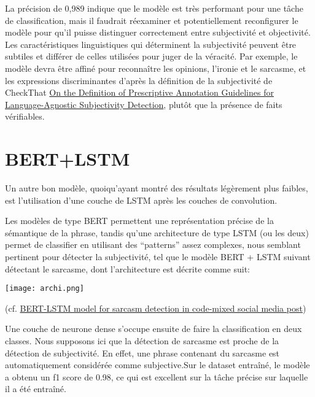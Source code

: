 \documentclass[11pt]{rapport_class}
\begin{document}
La précision de 0,989 indique que le modèle est très performant pour une tâche de classification, mais il faudrait réexaminer et potentiellement reconfigurer le modèle pour qu'il puisse distinguer correctement entre subjectivité et objectivité. Les caractéristiques linguistiques qui déterminent la subjectivité peuvent être subtiles et différer de celles utilisées pour juger de la véracité. Par exemple, le modèle devra être affiné pour reconnaître les opinions, l’ironie et le sarcasme, et les expressions discriminantes d'après la définition de la subjectivité de CheckThat \href{https://ceur-ws.org/Vol-3370/paper10.pdf}{On the Definition of Prescriptive Annotation
Guidelines for Language-Agnostic Subjectivity
Detection}, plutôt que la présence de faits vérifiables.

\section{BERT+LSTM}
\qquad Un autre bon modèle, quoiqu'ayant montré des résultats légèrement plus faibles, est l'utilisation d'une couche de LSTM après les couches de convolution.
\vspace{0mm}

Les modèles de type BERT permettent une représentation précise de la sémantique de la phrase, tandis qu'une architecture de type LSTM (ou les deux) permet de classifier en utilisant des “patterns” assez complexes, nous semblant pertinent pour détecter la subjectivité, tel que le modèle BERT + LSTM suivant détectant le sarcasme, dont l'architecture est décrite comme suit:

\begin{center}
    \texttt{[image: archi.png]}\\
    \begin{tiny}
        (cf. \href{https://link-springer-com.gorgone.univ-toulouse.fr/article/10.1007/s10844-022-00755-z}{BERT-LSTM model for sarcasm detection in code-mixed social media post})\\
        \vspace{0mm}
    \end{tiny}
\end{center}

\qquad Une couche de neurone dense s’occupe ensuite de faire la classification en deux classes. Nous supposons ici que la détection de sarcasme est proche de la détection de subjectivité. En effet, une phrase contenant du sarcasme est automatiquement considérée comme subjective.Sur le dataset entraîné, le modèle a obtenu un f1 score de 0.98, ce qui est excellent sur la tâche précise sur laquelle il a été entraîné. 
\end{document}
